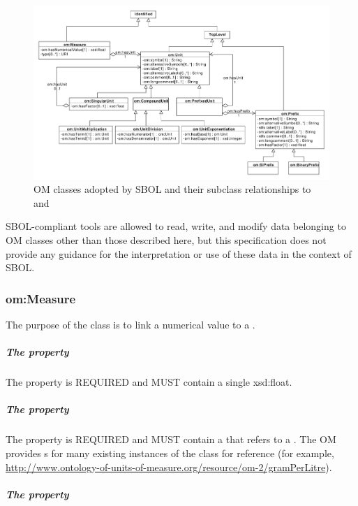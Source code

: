 \begin{figure}[ht]
\begin{center}
\includegraphics[width=\linewidth]{uml/om}
\caption[]{OM classes adopted by SBOL and their subclass relationships to  and }
\label{uml:om}
\end{center}
\end{figure}

SBOL-compliant tools are allowed to read, write, and modify data belonging to OM classes other than those described here, but this specification does not provide any guidance for the interpretation or use of these data in the context of SBOL.

\subsubsection{om:Measure} \label{sec:om:Measure}

The purpose of the  class is to link a numerical value to a . 

\subparagraph{The  property}\label{sec:om:hasNumericalValue}
The  property is REQUIRED and MUST contain a single xsd:float.

\subparagraph{The  property}\label{sec:om:hasUnit:Measure}
The  property is REQUIRED and MUST contain a  that refers to a . The OM provides s for many existing instances of the  class for reference (for example,\\ \url{http://www.ontology-of-units-of-measure.org/resource/om-2/gramPerLitre}).

\subparagraph{The  property}\label{sec:type:Measure}

